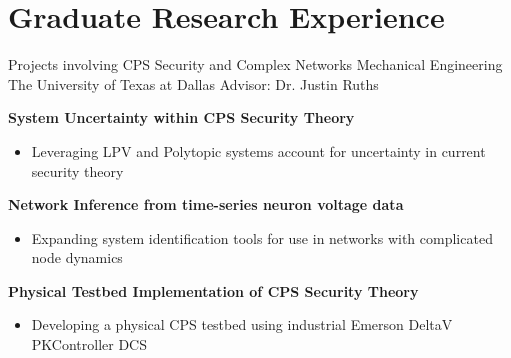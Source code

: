 \section{Graduate Research Experience}

{Projects involving CPS Security and Complex Networks}
{Mechanical Engineering}
{The University of Texas at Dallas}
{Advisor: Dr. Justin Ruths}
{
\textbf{System Uncertainty within CPS Security Theory}
\begin{itemize}
    \item Leveraging LPV and Polytopic systems account for uncertainty in current security theory
\end{itemize}
\textbf{Network Inference from time-series neuron voltage data}
\begin{itemize}
    \item Expanding system identification tools for use in networks with complicated node dynamics
\end{itemize}
\textbf{Physical Testbed Implementation of CPS Security Theory}
\begin{itemize}
    \item Developing a physical CPS testbed using industrial Emerson DeltaV PKController DCS
\end{itemize}
}